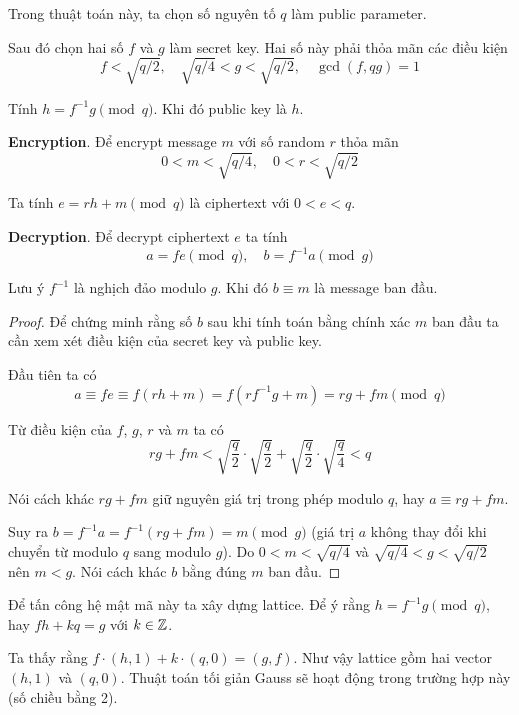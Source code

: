 Trong thuật toán này, ta chọn số nguyên tố $q$ làm public parameter.

Sau đó chọn hai số $f$ và $g$ làm secret key. Hai số này phải thỏa mãn các điều kiện \[ f < \sqrt{q/2}, \quad \sqrt{q/4} < g < \sqrt{q/2}, \quad \gcd(f, qg) = 1 \]

Tính $h = f^{-1} g \pmod q$. Khi đó public key là $h$.

\textbf{Encryption}. Để encrypt message $m$ với số random $r$ thỏa mãn \[ 0 < m < \sqrt{q/4}, \quad 0 < r < \sqrt{q/2} \]

Ta tính $e = rh + m \pmod q$ là ciphertext với $0 < e < q$.

\textbf{Decryption}. Để decrypt ciphertext $e$ ta tính \[ a = fe \pmod q, \quad b = f^{-1} a \pmod g \]

Lưu ý $f^{-1}$ là nghịch đảo modulo $g$. Khi đó $b \equiv m$ là message ban đầu.

\begin{proof}
    Để chứng minh rằng số $b$ sau khi tính toán bằng chính xác $m$ ban đầu ta cần xem xét điều kiện của secret key và public key.

    Đầu tiên ta có \[ a \equiv fe \equiv f(rh + m) = f(r f^{-1} g + m) = rg + fm \pmod q \]

    Từ điều kiện của $f$, $g$, $r$ và $m$ ta có \[ rg + fm < \sqrt{\dfrac{q}{2}} \cdot \sqrt{\dfrac{q}{2}} + \sqrt{\dfrac{q}{2}} \cdot \sqrt{\dfrac{q}{4}} < q \]

    Nói cách khác $rg + fm$ giữ nguyên giá trị trong phép modulo $q$, hay $a \equiv rg + fm$.

    Suy ra $b = f^{-1} a = f^{-1} (rg + fm) = m \pmod g$ (giá trị $a$ không thay đổi khi chuyển từ modulo $q$ sang modulo $g$). Do $0 < m < \sqrt{q/4}$ và $\sqrt{q/4} < g < \sqrt{q/2}$ nên $m < g$. Nói cách khác $b$ bằng đúng $m$ ban đầu.
\end{proof}

Để tấn công hệ mật mã này ta xây dựng lattice. Để ý rằng $h = f^{-1} g \pmod q$, hay $fh + kq = g$ với $k \in \mathbb{Z}$.

Ta thấy rằng $f \cdot (h, 1) + k \cdot (q, 0) = (g, f)$. Như vậy lattice gồm hai vector $(h, 1)$ và $(q, 0)$. Thuật toán tối giản Gauss sẽ hoạt động trong trường hợp này (số chiều bằng 2).
